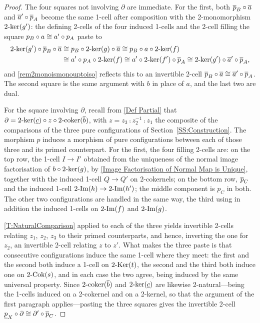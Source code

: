 \begin{proof}
  The four squares not involving \(\partial\) are immediate. For the first, both \(\overline{p}_B\circ\overline{a}\) and \(\overline{a}'\circ\overline{p}_A\) become the same 1-cell after composition with the 2-monomorphism \(2\text{-}\mathrm{ker}(g')\): the defining 2-cells of the four induced 1-cells and the 2-cell filling the square \(p_B\circ a\cong a'\circ p_A\) paste to
	\begin{align*}
		2\text{-}\mathrm{ker}(g')\circ\overline{p}_B\circ\overline{a}
		 & \cong p_B\circ2\text{-}\mathrm{ker}(g)\circ\overline{a}
		\cong p_B\circ a\circ2\text{-}\mathrm{ker}(f)        \\
		 & \cong a'\circ p_A\circ2\text{-}\mathrm{ker}(f)
		\cong a'\circ2\text{-}\mathrm{ker}(f')\circ\overline{p}_A
		\cong2\text{-}\mathrm{ker}(g')\circ\overline{a}'\circ\overline{p}_A\text{,}
	\end{align*}
	and \remx\ref{rem2monoismonouptoiso} reflects this to an invertible 2-cell \(\overline{p}_B\circ\overline{a}\cong\overline{a}'\circ\overline{p}_A\). The second square is the same argument with \(b\) in place of \(a\), and the last two are dual.

	For the square involving \(\partial\), recall from \eqref{Def Partial} that \(\partial=2\text{-}\mathrm{ker}(\underline{c})\circ z\circ2\text{-}\mathrm{coker}(\overline{b})\), with \(z=z_3\comp z_2^{-1}\comp z_1\) the composite of the comparisons of the three pure configurations of Section~\ref{SS:Construction}. The morphism \(p\) induces a morphism of pure configurations between each of those three and its primed counterpart. For the first, the four filling 2-cells are: on the top row, the 1-cell \(I\to I'\) obtained from the uniqueness of the normal image factorisation of \(b\circ2\text{-}\mathrm{ker}(g)\), by \prox\ref{Image Factorisation of Normal Map is Unique}, together with the induced 1-cell \(Q\to Q'\) on 2-cokernels; on the bottom row, \(\overline{p}_C\) and the induced 1-cell \(2\text{-}\mathrm{Im}(h)\to2\text{-}\mathrm{Im}(h')\); the middle component is \(p_C\) in both. The other two configurations are handled in the same way, the third using in addition the induced 1-cells on \(2\text{-}\mathrm{Im}(f)\) and \(2\text{-}\mathrm{Im}(g)\).

	\thex\ref{T:NaturalComparison} applied to each of the three yields invertible 2-cells relating \(z_1\), \(z_2\), \(z_3\) to their primed counterparts, and hence, inverting the one for \(z_2\), an invertible 2-cell relating \(z\) to \(z'\). What makes the three paste is that consecutive configurations induce the same 1-cell where they meet: the first and the second both induce a 1-cell on \(2\text{-}\mathrm{Ker}(t)\), the second and the third both induce one on \(2\text{-}\mathrm{Cok}(s)\), and in each case the two agree, being induced by the same universal property. Since \(2\text{-}\mathrm{coker}(\overline{b})\) and \(2\text{-}\mathrm{ker}(\underline{c})\) are likewise 2-natural---being the 1-cells induced on a 2-cokernel and on a 2-kernel, so that the argument of the first paragraph applies---pasting the three squares gives the invertible 2-cell \(\underline{p}_X\circ\partial\cong\partial'\circ\overline{p}_C\).
\end{proof}

